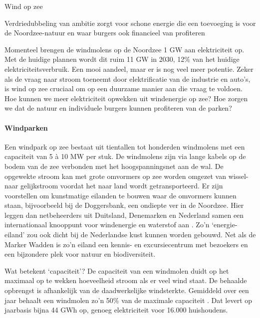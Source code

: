 \begin{voorstel}{Wind op zee}

\begin{samenvatting}
Verdriedubbeling van ambitie zorgt voor schone energie die een toevoeging is voor de Noordzee-natuur en waar burgers ook financieel van profiteren
\end{samenvatting}

\begin{uitdaging}
Momenteel brengen de windmolens op de Noordzee 1 GW aan elektriciteit op. Met de huidige plannen wordt dit ruim 11 GW in 2030, 12\% van het huidige elektriciteitsverbruik. Een mooi aandeel, maar er is nog veel meer potentie. Zeker als de vraag naar stroom toeneemt door elektrificatie van de industrie en auto’s, is wind op zee cruciaal om op een duurzame manier aan die vraag te voldoen. Hoe kunnen we meer elektriciteit opwekken uit windenergie op zee? Hoe zorgen we dat de natuur en individuele burgers kunnen profiteren van de parken?
\end{uitdaging}

\begin{overwegingen}

\paragraph{Windparken}
Een windpark op zee bestaat uit tientallen tot honderden windmolens met een capaciteit van 5 à 10 MW per stuk. De windmolens zijn via lange kabels op de bodem van de zee verbonden met het hoogspanningsnet aan de wal. De opgewekte stroom kan met grote omvormers op zee worden omgezet van wissel- naar gelijkstroom voordat het naar land wordt getransporteerd.  Er zijn voorstellen om kunstmatige eilanden te bouwen waar de omvormers kunnen staan, bijvoorbeeld bij de Doggersbank, een ondiepte ver in de Noordzee. Hier leggen dan netbeheerders uit Duitsland, Denemarken en Nederland samen een internationaal knooppunt voor windenergie en waterstof aan \parencite{north_sea_wind_power_hub_north_2019}. Zo’n `energie-eiland' zou ook dicht bij de Nederlandse kust kunnen worden gebouwd. Net als de Marker Wadden is zo’n eiland een kennis- en excursiecentrum met bezoekers en een bijzondere plek voor natuur en biodiversiteit.

\begin{infobox}{Wat betekent ‘capaciteit’?}
De capaciteit van een windmolen duidt op het maximaal op te wekken hoeveelheid stroom als er veel wind staat. De behaalde opbrengst is afhankelijk van de daadwerkelijke windsterkte. Gemiddeld over een jaar behaalt een windmolen zo’n 50\% van de maximale capaciteit \parencite{lensink_kosten_2017}. Dat levert op jaarbasis bijna 44 GWh op, genoeg elektriciteit voor 16.000 huishoudens.
\end{infobox}


\end{overwegingen}
\end{voorstel}
